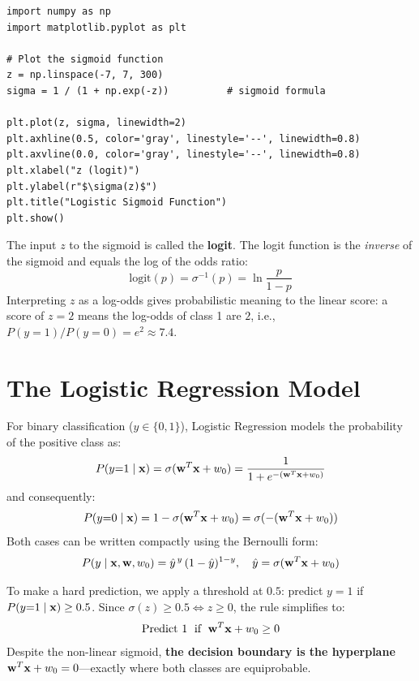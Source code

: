\begin{lstlisting}[style=pythonstyle]
import numpy as np
import matplotlib.pyplot as plt

# Plot the sigmoid function
z = np.linspace(-7, 7, 300)
sigma = 1 / (1 + np.exp(-z))          # sigmoid formula

plt.plot(z, sigma, linewidth=2)
plt.axhline(0.5, color='gray', linestyle='--', linewidth=0.8)
plt.axvline(0.0, color='gray', linestyle='--', linewidth=0.8)
plt.xlabel("z (logit)")
plt.ylabel(r"$\sigma(z)$")
plt.title("Logistic Sigmoid Function")
plt.show()
\end{lstlisting}

\begin{remark}
The input $z$ to the sigmoid is called the \textbf{logit}. The logit function is the \textit{inverse} of the sigmoid and equals the log of the odds ratio:
$$\text{logit}(p) = \sigma^{-1}(p) = \ln\frac{p}{1-p}$$
Interpreting $z$ as a log-odds gives probabilistic meaning to the linear score: a score of $z=2$ means the log-odds of class 1 are $2$, i.e., $P(y{=}1)/P(y{=}0) = e^2 \approx 7.4$.
\end{remark}

\section*{The Logistic Regression Model}

For binary classification ($y \in \{0, 1\}$), Logistic Regression models the probability of the positive class as:
$$P(y{=}1 \mid \mathbf{x}) = \sigma(\mathbf{w}^T\mathbf{x} + w_0) = \frac{1}{1 + e^{-(\mathbf{w}^T\mathbf{x} + w_0)}}$$
and consequently:
$$P(y{=}0 \mid \mathbf{x}) = 1 - \sigma(\mathbf{w}^T\mathbf{x} + w_0) = \sigma(-(\mathbf{w}^T\mathbf{x} + w_0))$$
Both cases can be written compactly using the Bernoulli form:
$$P(y \mid \mathbf{x}, \mathbf{w}, w_0) = \hat{y}^{\,y}\,(1-\hat{y})^{1-y}, \quad \hat{y} = \sigma(\mathbf{w}^T\mathbf{x} + w_0)$$

\begin{remark}
To make a hard prediction, we apply a threshold at $0.5$: predict $y{=}1$ if $P(y{=}1 \mid \mathbf{x}) \geq 0.5$. Since $\sigma(z) \geq 0.5 \iff z \geq 0$, the rule simplifies to:
$$\text{Predict } 1 \;\text{ if }\; \mathbf{w}^T\mathbf{x} + w_0 \geq 0$$
Despite the non-linear sigmoid, \textbf{the decision boundary is the hyperplane} $\mathbf{w}^T\mathbf{x} + w_0 = 0$---exactly where both classes are equiprobable.
\end{remark}

